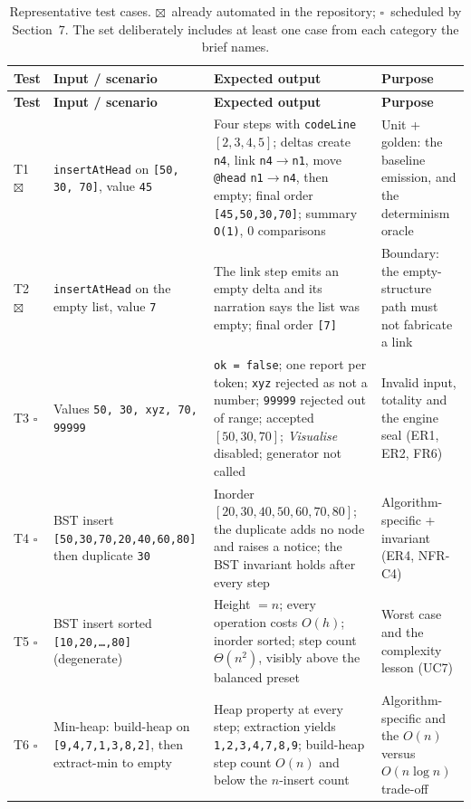 \documentclass[11pt,a4paper]{article}
\newcommand{\ct}[1]{\texttt{#1}}
\newcommand{\done}{\textcolor{okc}{$\boxtimes$}}
\newcommand{\todo}{\textcolor{rulec}{$\square$}}
\begin{document}
{\footnotesize
\setlength{\tabcolsep}{4pt}
\begin{longtable}{@{}L{0.8cm}L{4.2cm}L{5.6cm}L{3.6cm}@{}}
\caption{Representative test cases. \done\ already automated in the repository; \todo\
scheduled by Section~7. The set deliberately includes at least one case from each category
the brief names.}\label{tab:cases}\\
\toprule
\textbf{Test} & \textbf{Input / scenario} & \textbf{Expected output} & \textbf{Purpose} \\
\midrule
\endfirsthead
\toprule
\textbf{Test} & \textbf{Input / scenario} & \textbf{Expected output} & \textbf{Purpose} \\
\midrule
\endhead
\bottomrule
\endlastfoot
T1 \done & \ct{insertAtHead} on \ct{[50, 30, 70]}, value \ct{45} & Four steps with
\ct{codeLine} $[2,3,4,5]$; deltas create \ct{n4}, link \ct{n4}$\to$\ct{n1}, move
\ct{@head} \ct{n1}$\to$\ct{n4}, then empty; final order \ct{[45,50,30,70]}; summary
\ct{O(1)}, 0 comparisons & Unit + golden: the baseline emission, and the determinism oracle \\
T2 \done & \ct{insertAtHead} on the empty list, value \ct{7} & The link step emits an empty
delta and its narration says the list was empty; final order \ct{[7]} & Boundary: the
empty-structure path must not fabricate a link \\
T3 \todo & Values \ct{50, 30, xyz, 70, 99999} & \ct{ok = false}; one report per token;
\ct{xyz} rejected as not a number; \ct{99999} rejected out of range; accepted $[50,30,70]$;
\emph{Visualise} disabled; generator not called & Invalid input, totality and the engine seal
(ER1, ER2, FR6) \\
T4 \todo & BST insert \ct{[50,30,70,20,40,60,80]} then duplicate \ct{30} & Inorder
$[20,30,40,50,60,70,80]$; the duplicate adds no node and raises a notice; the BST invariant
holds after every step & Algorithm-specific + invariant (ER4, NFR-C4) \\
T5 \todo & BST insert sorted \ct{[10,20,\dots,80]} (degenerate) & Height $= n$; every
operation costs $O(h)$; inorder sorted; step count $\Theta(n^2)$, visibly above the balanced
preset & Worst case and the complexity lesson (UC7) \\
T6 \todo & Min-heap: build-heap on \ct{[9,4,7,1,3,8,2]}, then extract-min to empty & Heap
property at every step; extraction yields \ct{1,2,3,4,7,8,9}; build-heap step count
$O(n)$ and below the $n$-insert count & Algorithm-specific and the $O(n)$ versus
$O(n\log n)$ trade-off \\

\end{longtable}}
\end{document}
